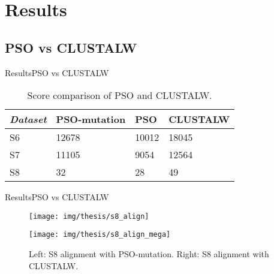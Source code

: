 \documentclass[10pt]{beamer}
\newcommand{\1}{
        	\setbeamertemplate{background}{
        		\texttt{[image: img/1]}
        		\tikz[overlay] \fill[fill opacity=0.75,fill=white] (0,0) rectangle (-\paperwidth,\paperheight);
        	}
}
\begin{document}
\section{Results}

\subsection{PSO vs CLUSTALW}


\begin{frame}{Results}{PSO vs CLUSTALW}
	\begin{table}[h]
		\centering
		\caption{Score comparison of PSO and CLUSTALW.}
		\begin{tabular}{p{2cm}p{2.5cm}p{2.5cm}p{2cm}}
			
			\textbf{\textit{Dataset}} & \textbf{PSO-mutation}  & \textbf{PSO} & \textbf{CLUSTALW} \\
			\hline			
			S6	& 12678	& 10012	& 18045 \\				
			S7 & 11105 & 9054 & 12564 \\
			S8 & 32 & 28 & 49 \\ 				
			\hline 
		\end{tabular}		
		\label{tab:result}
	\end{table}
\end{frame}

\begin{frame}{Results}{PSO vs CLUSTALW}
	\begin{figure}[h]
		\centering
		\begin{multicols}{2}
			\texttt{[image: img/thesis/s8\_align]}\par 
			\texttt{[image: img/thesis/s8\_align\_mega]}\par 
		\end{multicols}
		\caption{Left: S8 alignment with PSO-mutation. Right: S8 alignment with CLUSTALW.}
		\label{fig:s8_align}
	\end{figure}
\end{frame}
\end{document}
